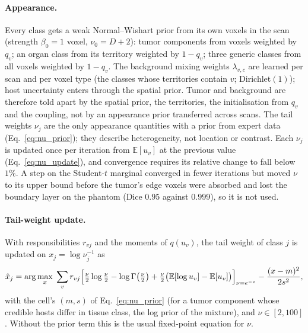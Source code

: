 \documentclass[fleqn,10pt]{olplainarticle}
\begin{document}
\paragraph{Appearance.} Every class gets a weak Normal--Wishart prior from its own voxels in the scan (strength $\beta_0=1$
voxel, $\nu_0=D+2$): tumor components from voxels weighted by $q_v$; an organ class from its territory weighted by $1-q_v$;
three generic classes from all voxels weighted by $1-q_v$. The background mixing weights $\lambda_{v,c}$ are learned per scan
and per voxel type (the classes whose territories contain $v$; Dirichlet$(1)$); host uncertainty enters through the spatial
prior. Tumor and background are therefore told apart by the spatial prior, the territories, the initialisation from $q_v$ and
the coupling, not by an appearance prior transferred across scans. The tail weights $\nu_j$ are the only appearance quantities
with a prior from expert data (Eq.~\eqref{eq:nu_prior}); they describe heterogeneity, not location or contrast. Each $\nu_j$ is
updated once per iteration from $\mathbb{E}[u_v]$ at the previous value (Eq.~\eqref{eq:nu_update}), and convergence requires its
relative change to fall below $1\%$. A step on the Student-$t$ marginal converged in fewer iterations but moved $\nu$ to its
upper bound before the tumor's edge voxels were absorbed and lost the boundary layer on the phantom (Dice $0.95$ against $0.999$),
so it is not used.

\paragraph{Tail-weight update.} With responsibilities $r_{vj}$ and the moments of $q(u_v)$, the tail weight of class $j$ is
updated on $x_j=\log\nu_j^{-1}$ as
\begin{equation}
\label{eq:nu_update}
\hat x_j=\arg\max_{x}\;\sum_v r_{vj}\Bigl[\tfrac{\nu}{2}\log\tfrac{\nu}{2}-\log\Gamma\bigl(\tfrac{\nu}{2}\bigr)
+\tfrac{\nu}{2}\bigl(\mathbb{E}[\log u_v]-\mathbb{E}[u_v]\bigr)\Bigr]_{\nu=e^{-x}}-\frac{(x-m)^2}{2s^2},
\end{equation}
with the cell's $(m,s)$ of Eq.~\eqref{eq:nu_prior} (for a tumor component whose credible hosts differ in tissue class, the
log prior of the mixture), and $\nu\in[2,100]$. Without the prior term this is the usual fixed-point equation for $\nu$.
\end{document}
